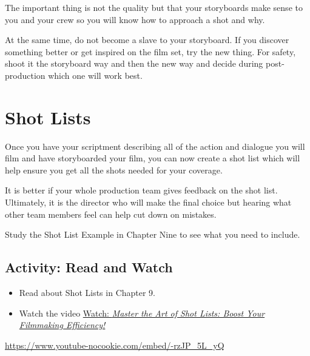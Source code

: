 \documentclass[
  letterpaper,
  DIV=11,
  numbers=noendperiod]{scrreprt}
\providecommand{\tightlist}{%
  \setlength{\itemsep}{0pt}\setlength{\parskip}{0pt}}\usepackage{longtable,booktabs,array}
\begin{document}
The important thing is not the quality but that your storyboards make
sense to you and your crew so you will know how to approach a shot and
why.

At the same time, do not become a slave to your storyboard. If you
discover something better or get inspired on the film set, try the new
thing. For safety, shoot it the storyboard way and then the new way and
decide during post-production which one will work best.

\section{Shot Lists}\label{shot-lists}

Once you have your scriptment describing all of the action and dialogue
you will film and have storyboarded your film, you can now create a shot
list which will help ensure you get all the shots needed for your
coverage.

It is better if your whole production team gives feedback on the shot
list. Ultimately, it is the director who will make the final choice but
hearing what other team members feel can help cut down on mistakes.

Study the Shot List Example in Chapter Nine to see what you need to
include.

\subsection{Activity: Read and Watch}\label{activity-read-and-watch-2}

\begin{tcolorbox}[enhanced jigsaw, titlerule=0mm, opacitybacktitle=0.6, left=2mm, title={Learning Activity}, coltitle=black, colbacktitle=quarto-callout-note-color!10!white, toptitle=1mm, bottomtitle=1mm, colframe=quarto-callout-note-color-frame, colback=white, arc=.35mm, rightrule=.15mm, bottomrule=.15mm, toprule=.15mm, opacityback=0, breakable, leftrule=.75mm]

\begin{itemize}
\tightlist
\item
  Read about Shot Lists in Chapter 9.
\item
  Watch the video
  \href{https://www.youtube.com/watch?v=-rzJP_5L_yQ}{Watch: \emph{Master
  the Art of Shot Lists: Boost Your Filmmaking Efficiency!}}
\end{itemize}

\url{https://www.youtube-nocookie.com/embed/-rzJP_5L_yQ}

\end{tcolorbox}
\end{document}
